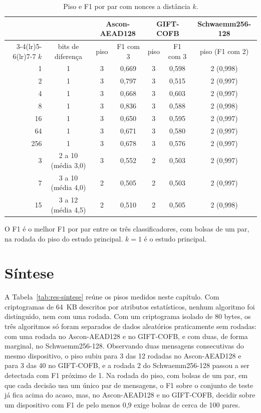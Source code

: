 \begin{table}[htb]
\centering
\caption{Piso e F1 por par com nonces a distância $k$.}
\label{tab:res-distancia}
\small
\setlength{\tabcolsep}{4pt}
\begin{tabular}{rcccccc}
\toprule
 & & \multicolumn{2}{c}{Ascon-AEAD128} & \multicolumn{2}{c}{GIFT-COFB} & Schwaemm256-128 \\
\cmidrule(lr){3-4}\cmidrule(lr){5-6}\cmidrule(lr){7-7}
$k$ & bits de diferença & piso & F1 com 3 & piso & F1 com 3 & piso (F1 com 2) \\
\midrule
1   & 1 & 3 & 0,669 & 3 & 0,598 & 2 (0,998) \\
2   & 1 & 3 & 0,797 & 3 & 0,515 & 2 (0,997) \\
4   & 1 & 3 & 0,668 & 3 & 0,603 & 2 (0,997) \\
8   & 1 & 3 & 0,836 & 3 & 0,588 & 2 (0,998) \\
16  & 1 & 3 & 0,650 & 3 & 0,595 & 2 (0,997) \\
64  & 1 & 3 & 0,671 & 3 & 0,580 & 2 (0,997) \\
256 & 1 & 3 & 0,678 & 3 & 0,576 & 2 (0,997) \\
\midrule
3   & 2 a 10 (média 3,0) & 3 & 0,552 & 2 & 0,503 & 2 (0,997) \\
7   & 3 a 10 (média 4,0) & 2 & 0,505 & 2 & 0,503 & 2 (0,997) \\
15  & 3 a 12 (média 4,5) & 2 & 0,510 & 2 & 0,505 & 2 (0,998) \\
\bottomrule
\end{tabular}
\par\smallskip\footnotesize O F1 é o melhor F1 por par entre os três classificadores, com bolsas de um par, na rodada do piso do estudo principal. $k=1$ é o estudo principal.
\end{table}


\section{Síntese}
\label{sec:res-sintese}

A Tabela~\ref{tab:res-sintese} reúne os pisos medidos neste capítulo. Com criptogramas de 64~KB descritos por atributos estatísticos, nenhum algoritmo foi distinguido, nem com uma rodada. Com um criptograma isolado de 80 bytes, os três algoritmos só foram separados de dados aleatórios praticamente sem rodadas: com uma rodada no Ascon-AEAD128 e no GIFT-COFB, e com duas, de forma marginal, no Schwaemm256-128. Observando duas mensagens consecutivas do mesmo dispositivo, o piso subiu para 3 das 12 rodadas no Ascon-AEAD128 e para 3 das 40 no GIFT-COFB, e a rodada 2 do Schwaemm256-128 passou a ser detectada com F1 próximo de 1. Na rodada do piso, com bolsas de um par, em que cada decisão usa um único par de mensagens, o F1 sobre o conjunto de teste já fica acima do acaso, mas, no Ascon-AEAD128 e no GIFT-COFB, decidir sobre um dispositivo com F1 de pelo menos 0,9 exige bolsas de cerca de 100 pares.

